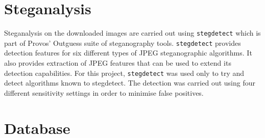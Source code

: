 \section {Steganalysis}
\label{sec:stegtool}
Steganalysis on the downloaded images are carried out using \texttt{stegdetect} which is part of Provos' Outguess suite of steganography tools. \texttt{stegdetect} provides detection features for six different types of JPEG steganographic algorithms. It also provides extraction of JPEG features that can be used to extend its detection capabilities. For this project, \texttt{stegdetect} was used only to try and detect algorithms known to stegdetect. The detection was carried out using four different sensitivity settings in order to minimise false positives.   
\section {Database}
\label{sec:database}

